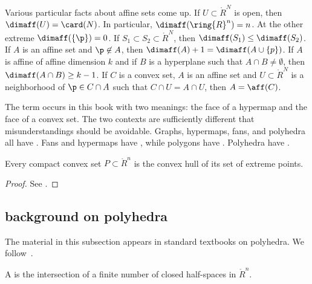 \begin{remark}\label{rem:affine-background}
Various particular facts about affine sets  come up.
If $U\subset\ring{R}^N$ is open, then $\dimaff(U) = \card(N)$.  In particular,
$\dimaff(\ring{R}^n) = n$.  At the other extreme $\dimaff(\{\p\}) = 0$.
If $S_1\subset S_2\subset\ring{R}^N$, then $\dimaff(S_1) \le \dimaff(S_2)$.
If $A$ is an affine set and $\p\not\in A$, then $\dimaff(A) +1 = \dimaff(A\cup\{p\})$.
If $A$ is affine of affine dimension $k$ and if $B$ is a hyperplane such that $A\cap B\ne\emptyset$, then $\dimaff (A\cap B)\ge k-1$.
If $C$ is a convex set, $A$ is an affine set and $U\subset \ring{R}^N$ 
is a neighborhood of $\p\in C\cap A$ such that $C\cap U = A\cap U$, then
$A=\aff(C)$.
\end{remark}


\begin{remark}[polysemes]\label{remark:face} 
The term  occurs in this book with two meanings: the
face of a hypermap and the face of a convex set.  The two contexts
are sufficiently different that  misunderstandings should be avoidable.
Graphs,  hypermaps, fans, and polyhedra all have .
Fans and hypermaps have , while polygons 
have .  Polyhedra have .
\end{remark}
%

\begin{lemma} Every compact
convex set $P\subset\ring{R}^n$ is the convex hull of its set of
extreme points.
\end{lemma}

\begin{proof}  See \cite[Theorem~2.6.16]{webster:1994}.
\end{proof}

\subsection{background on polyhedra}


The material in this subsection appears in standard textbooks on polyhedra.
We follow~\cite{webster:1994}.

\begin{definition}[polyhedron]
A  is the
intersection of a finite number of closed half-spaces in
$\ring{R}^n$.  
\end{definition}
%

